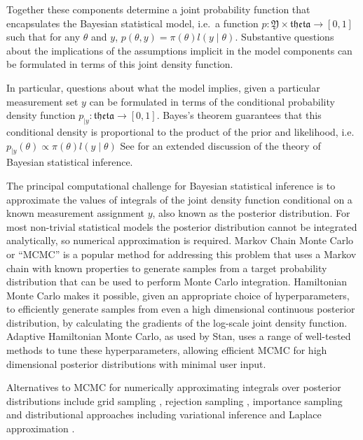 \documentclass[journal=asbcd6,manuscript=article,layout=traditional]{achemso}
\begin{document}
Together these components determine a joint probability function that
encapsulates the Bayesian statistical model, i.e.~a function
\(p: \mathfrak{Y}\times\mathfrak{theta}\rightarrow[0,1]\) such that for
any \(\theta\) and \(y\), \(p(\theta, y) = \pi(\theta)l(y\mid\theta)\).
Substantive questions about the implications of the assumptions implicit
in the model components can be formulated in terms of this joint density
function.

In particular, questions about what the model implies, given a
particular measurement set \(y\) can be formulated in terms of the
conditional probability density function
\(p_{\mid y}:\mathfrak{theta}\rightarrow[0,1]\). Bayes's theorem
guarantees that this conditional density is proportional to the product
of the prior and likelihood,
i.e.~\(p_{\mid y}(\theta) \propto \pi(\theta)l(y\mid\theta)\) See
\citep[Ch 1]{gelmanBayesianDataAnalysis2020a} for an extended discussion
of the theory of Bayesian statistical inference.

The principal computational challenge for Bayesian statistical inference
is to approximate the values of integrals of the joint density function
conditional on a known measurement assignment \(y\), also known as the
posterior distribution. For most non-trivial statistical models the
posterior distribution cannot be integrated analytically, so numerical
approximation is required. Markov Chain Monte Carlo or ``MCMC'' is a
popular method for addressing this problem that uses a Markov chain with
known properties to generate samples from a target probability
distribution that can be used to perform Monte Carlo integration.
Hamiltonian Monte Carlo makes it possible, given an appropriate choice
of hyperparameters, to efficiently generate samples from even a high
dimensional continuous posterior distribution, by calculating the
gradients of the log-scale joint density function. Adaptive Hamiltonian
Monte Carlo, as used by Stan, uses a range of well-tested methods to
tune these hyperparameters, allowing efficient MCMC for high dimensional
posterior distributions with minimal user input.

Alternatives to MCMC for numerically approximating integrals over
posterior distributions include grid sampling \citep[ Ch.
10]{gelmanBayesianDataAnalysis2020a}, rejection sampling \citep[Ch.
10]{gelmanBayesianDataAnalysis2020a}, importance sampling
\citep{vehtariParetoSmoothedImportance2022} and distributional
approaches including variational inference and Laplace approximation
\citep[Ch. 13]{gelmanBayesianDataAnalysis2020a}.
\end{document}
